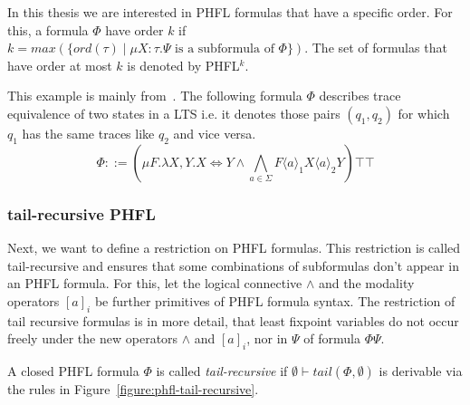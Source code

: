 In this thesis we are interested in PHFL formulas that have a specific order. For this, a formula $\Phi$ have order $k$
if $k = max(\{ord(\tau)\mid \mu X \colon \tau. \Psi \text{ is a subformula of } \Phi\})$. The set of formulas that have
order at most $k$ is denoted by PHFL$^k$.

\begin{example}
    This example is mainly from~\cite{lange2014capturing}. The following formula $\Phi$ describes trace
    equivalence of two states in a LTS i.e. it denotes those pairs $(q_1, q_2)$ for which $q_1$ has the same traces
    like $q_2$ and vice versa.
    \[\Phi ::= (\mu F. \lambda X, Y. X \Leftrightarrow Y \wedge \underset{a \in \Sigma}{\bigwedge} F \langle a
    \rangle_1 X \langle a \rangle_2 Y)\top \top\]
\end{example}

\subsubsection{tail-recursive PHFL}

Next, we want to define a restriction on PHFL formulas. This restriction is called tail-recursive and ensures that
some combinations of subformulas don't appear in an PHFL formula. For this, let the logical connective
$\wedge$ and the modality operators $[a]_i$ be further primitives of PHFL formula syntax. The restriction of tail
recursive formulas is in more detail, that least fixpoint variables do not occur freely under the new operators
$\wedge$ and $[a]_i$, nor in $\Psi$ of formula $\Phi\Psi$.

\begin{definition}
    A closed PHFL formula $\Phi$ is called \emph{tail-recursive} if $\emptyset \vdash tail(\Phi, \emptyset)$ is
    derivable via the rules in Figure~\ref{figure:phfl-tail-recursive}.
\end{definition}

